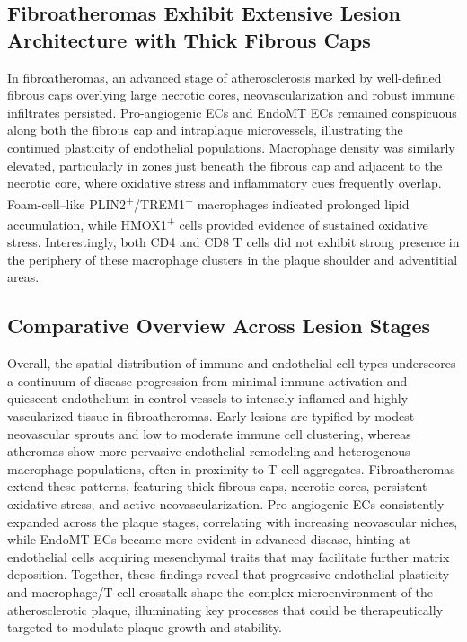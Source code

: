 \documentclass[a4paper,12pt]{article}
\begin{document}
\subsection{Fibroatheromas Exhibit Extensive Lesion Architecture with Thick Fibrous Caps}
In fibroatheromas, an advanced stage of atherosclerosis marked by well-defined fibrous caps overlying large necrotic cores, neovascularization and robust immune infiltrates persisted. Pro-angiogenic ECs and EndoMT ECs remained conspicuous along both the fibrous cap and intraplaque microvessels, illustrating the continued plasticity of endothelial populations. Macrophage density was similarly elevated, particularly in zones just beneath the fibrous cap and adjacent to the necrotic core, where oxidative stress and inflammatory cues frequently overlap. Foam-cell–like PLIN2\textsuperscript{+}/TREM1\textsuperscript{+} macrophages indicated prolonged lipid accumulation, while HMOX1\textsuperscript{+} cells provided evidence of sustained oxidative stress. Interestingly, both CD4 and CD8 T cells did not exhibit strong presence in the periphery of these macrophage clusters in the plaque shoulder and adventitial areas.

\subsection{Comparative Overview Across Lesion Stages}
Overall, the spatial distribution of immune and endothelial cell types underscores a continuum of disease progression from minimal immune activation and quiescent endothelium in control vessels to intensely inflamed and highly vascularized tissue in fibroatheromas. Early lesions are typified by modest neovascular sprouts and low to moderate immune cell clustering, whereas atheromas show more pervasive endothelial remodeling and heterogenous macrophage populations, often in proximity to T-cell aggregates. Fibroatheromas extend these patterns, featuring thick fibrous caps, necrotic cores, persistent oxidative stress, and active neovascularization. Pro-angiogenic ECs consistently expanded across the plaque stages, correlating with increasing neovascular niches, while EndoMT ECs became more evident in advanced disease, hinting at endothelial cells acquiring mesenchymal traits that may facilitate further matrix deposition. Together, these findings reveal that progressive endothelial plasticity and macrophage/T-cell crosstalk shape the complex microenvironment of the atherosclerotic plaque, illuminating key processes that could be therapeutically targeted to modulate plaque growth and stability.
\end{document}
